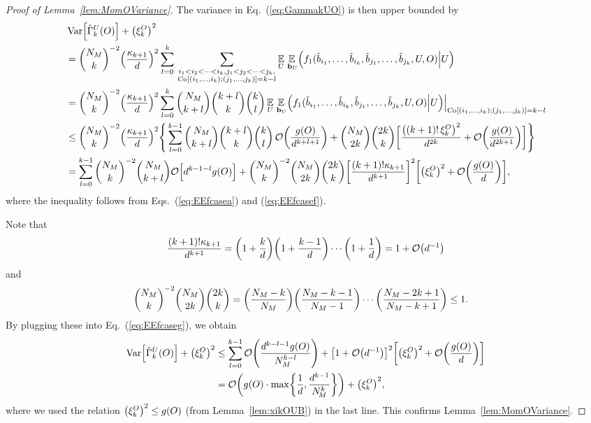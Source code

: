 \documentclass[aps,prl,twocolumn,nofootinbib,superscriptaddress,10pt]{revtex4-2}
\let\originalleft\left
\let\originalright\right
\renewcommand{\left}{\mathopen{}\mathclose\bgroup\originalleft}
\renewcommand{\right}{\aftergroup\egroup\originalright}
\def\E{ {\mathbb E} } %
\DeclareMathOperator{\Var}{Var}
\newcommand{\bigo}[1]{\mathcal{O}\left(#1\right)}
\theoremstyle{plain}
\theoremstyle{definition}
\def\eqref#1{\textup{(\ref{#1})}}
\newcommand{\eref}[1]{Eq.~\textup{(\ref{#1})}}
\newcommand{\lref}[1]{Lemma~\ref{#1}}
\begin{document}
\begin{proof}[Proof of \lref{lem:MomOVariance}]
The variance in \eref{eq:GammakUO} is then upper bounded by
\begin{align}\label{eq:EEfcaseg}
&\Var\left[ \hat{\Gamma}_k^U (O)\right] +\left( \xi_k^{O}\right)^2
\nonumber\\
&= \binom{N_M}{k}^{-2} \left( \frac{\kappa_{k+1}}{d}\right)^2
\sum_{l=0}^{k} \,
\sum_{\substack{i_1<i_2<\dots<i_k, j_1<j_2<\dots<j_k, \\{\rm Co}[(i_1,\dots,i_k);(j_1,\dots,j_k)]=k-l }} 
\underset{U }{\E} \, \underset{\,\mathbf{b}_{U}}{\E} \Big(
f_1(\hat{b}_{i_1},\dots,\hat{b}_{i_k},\hat{b}_{j_1},\dots,\hat{b}_{j_k}, U,O)\Big| U \Big) 
\nonumber\\
&= 
\binom{N_M}{k}^{-2} \left( \frac{\kappa_{k+1}}{d}\right)^2
\sum_{l=0}^{k} 
\binom{N_M}{k+l} \binom{k+l}{k} \binom{k}{l} \, 
\underset{U }{\E} \, \underset{\,\mathbf{b}_{U}}{\E} \Big(
f_1(\hat{b}_{i_1},\dots,\hat{b}_{i_k},\hat{b}_{j_1},\dots,\hat{b}_{j_k}, U,O)\Big| U \Big)\Big|_{{\rm Co}[(i_1,\dots,i_k);(j_1,\dots,j_k)]=k-l}
\nonumber\\
&\leq 
\binom{N_M}{k}^{-2} \left( \frac{\kappa_{k+1}}{d}\right)^2
\left\lbrace \,  
\sum_{l=0}^{k-1} 
\binom{N_M}{k+l} \binom{k+l}{k} \binom{k}{l} \, 
\bigo{\frac{g(O)}{d^{k+l+1}}}
+   
\binom{N_M}{2k} \binom{2k}{k}
\bigg[\frac{\left( (k+1)!\,\xi_k^{O}\right)^2}{d^{2k}} +\bigo{\frac{g(O)}{d^{2k+1}}}
\bigg]\right\rbrace 
\nonumber\\
&= 
\sum_{l=0}^{k-1}\binom{N_M}{k}^{-2}  
\binom{N_M}{k+l} \mathcal{O}\Big[d^{k-1-l}g(O)\Big]
+ 
\binom{N_M}{k}^{-2}  \binom{N_M}{2k}\binom{2k}{k} \left[ \frac{(k+1)!\kappa_{k+1}}{d^{k+1}} \right]^2 
\left[\left( \xi_k^{O}\right) ^2 + \bigo{\frac{g(O)}{d}} \right], 
\end{align}
where the inequality follows from Eqs.~\eqref{eq:EEfcasea} and \eqref{eq:EEfcasef}. 

Note that 
\begin{align}
	\frac{(k+1)!\kappa_{k+1}}{d^{k+1}}
	= \left( 1+ \frac{k}{d} \right) \left( 1+ \frac{k-1}{d} \right) \cdots \left( 1+ \frac{1}{d} \right) 
	= 1+\bigo{d^{-1}}
\end{align}
and 
\begin{align} 
	\binom{N_M}{k}^{-2}  \binom{N_M}{2k}\binom{2k}{k}
	&= \left( \frac{N_M-k}{N_M}\right)  \left( \frac{N_M-k-1}{N_M-1}\right)  \cdots \left(\frac{N_M-2k+1}{N_M-k+1}\right) 
	\leq 1.
\end{align}
By plugging these into \eref{eq:EEfcaseg}, we obtain 
\begin{align} 
\Var\left[ \hat{\Gamma}_k^U (O)\right] +\left( \xi_k^{O}\right)^2
&\leq
\sum_{l=0}^{k-1} \bigo{\frac{d^{k-l-1}g(O)}{N_M^{k-l}}} 
+ \left[1+\bigo{d^{-1}}\right]^2 
\left[\left( \xi_k^{O}\right) ^2 + \bigo{\frac{g(O)}{d}} \right]
\nonumber\\ 
&= 
\bigo{g(O)\cdot \max\left\lbrace \frac{1}{d} ,\frac{d^{k-1}}{N_{\!M}^{k}}\right\rbrace  }  +\left( \xi_k^{O}\right) ^2,
\end{align}
where we used the relation $\left( \xi_k^{O}\right)^2\leq g(O)$ (from \lref{lem:xikOUB}) in the last line. 
This confirms \lref{lem:MomOVariance}. 
\end{proof}
\end{document}
